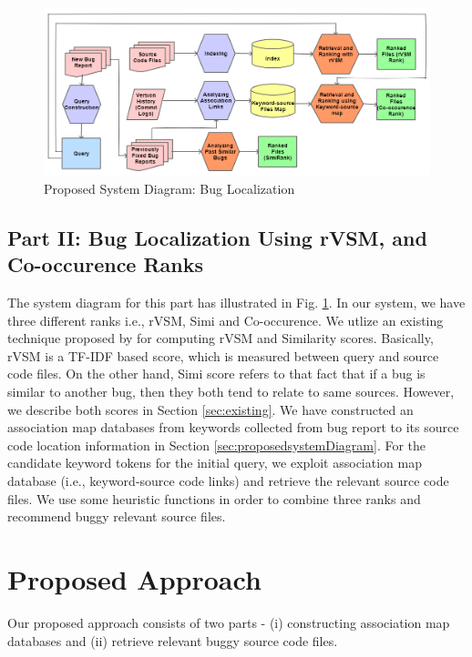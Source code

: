 \documentclass[conference]{IEEEtran}
\begin{document}
\begin{figure}
	\centering
	\includegraphics[scale=0.75]{SD1}
	\caption{Proposed System Diagram: Bug Localization}
	\label{fig:BL}
\end{figure}

\subsection{Part II: Bug Localization Using rVSM, and Co-occurence Ranks}

The system diagram for this part has illustrated in Fig. \ref{fig:BL}.
In our system, we have three different ranks i.e., rVSM, Simi and Co-occurence. We utlize an existing technique proposed by \citet{Jian} for computing rVSM and Similarity scores. Basically, rVSM is a TF-IDF based score, which is measured between query and source code files.
On the other hand, Simi score refers to that fact that if a bug is similar to another bug, then they both tend to relate to same sources. However, we describe both scores in Section \ref{sec:existing}.
We have constructed an association map databases from keywords collected from bug report to its source code location information in Section \ref{sec:proposedsystemDiagram}.
For the candidate keyword tokens for the initial query, we exploit association map database (i.e., keyword-source code links) and retrieve the relevant source code files. We use some heuristic functions in order to combine three ranks and recommend buggy relevant source files. 


\section{Proposed Approach}\label{sec:proposedApproach}
Our proposed approach consists of two parts - (i) constructing association map databases and (ii) retrieve relevant buggy source code files. 
\end{document}
